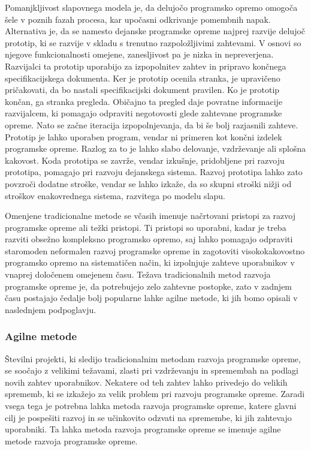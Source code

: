 \documentclass[a4paper,12pt,openright]{book}
\begin{document}
Pomanjkljivost slapovnega modela je, da delujočo programsko opremo omogoča šele v poznih fazah procesa, kar upočasni odkrivanje pomembnih napak. Alternativa je, da se namesto dejanske programske opreme najprej razvije delujoč prototip, ki se razvije v skladu s trenutno razpoložljivimi zahtevami. V osnovi so njegove  funkcionalnosti omejene, zanesljivost pa je nizka in nepreverjena. \\
Razvijalci ta prototip uporabijo za izpopolnitev zahtev in pripravo končnega specifikacijskega dokumenta. Ker je prototip ocenila stranka, je upravičeno pričakovati, da bo nastali specifikacijski dokument pravilen. Ko je prototip končan, ga stranka pregleda. Običajno ta pregled daje povratne informacije razvijalcem, ki pomagajo odpraviti negotovosti glede zahtevane programske opreme. Nato se začne iteracija izpopolnjevanja, da bi še bolj razjasnili zahteve. \\
Prototip je lahko uporaben program, vendar ni primeren kot končni izdelek programske opreme. Razlog za to je lahko slabo delovanje, vzdrževanje ali splošna kakovost. Koda prototipa se zavrže, vendar izkušnje, pridobljene pri razvoju prototipa, pomagajo pri razvoju dejanskega sistema. Razvoj prototipa lahko zato povzroči dodatne stroške, vendar se lahko izkaže, da so skupni stroški nižji od stroškov enakovrednega sistema, razvitega po modelu slapu. \cite{aggarwal2005software}

Omenjene tradicionalne metode se včasih imenuje načrtovani pristopi za razvoj programske opreme ali težki pristopi. Ti pristopi so uporabni, kadar je treba razviti obsežno kompleksno programsko opremo, saj lahko pomagajo odpraviti staromoden neformalen razvoj programske opreme in zagotoviti visokokakovostno programsko opremo na sistematičen način, ki izpolnjuje zahteve uporabnikov v vnaprej določenem omejenem času. Težava tradicionalnih metod razvoja programske opreme je, da potrebujejo zelo zahtevne postopke, zato v zadnjem času postajajo čedalje bolj popularne lahke agilne metode, ki jih bomo opisali v naslednjem podpoglavju.


\subsubsection{Agilne metode}
\sloppy
Številni projekti, ki sledijo tradicionalnim metodam razvoja programske opreme, se soočajo z velikimi težavami, zlasti pri vzdrževanju in spremembah na podlagi novih zahtev uporabnikov. Nekatere od teh zahtev lahko privedejo do velikih sprememb, ki se izkažejo za velik problem pri razvoju programske opreme.  Zaradi vsega tega je potrebna lahka metoda razvoja programske opreme, katere glavni cilj je pospešiti razvoj in se učinkovito odzvati na spremembe, ki jih zahtevajo uporabniki. Ta lahka metoda razvoja programske opreme se imenuje agilne metode razvoja programske opreme. 
\cite{AlSaqqa2020AgileSD}
\end{document}
